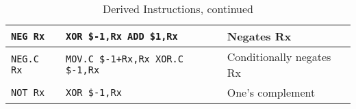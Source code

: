\documentclass{gqtekspec}
\begin{document}
\begin{table}
\begin{center}
\begin{tabular}{p{1.1in}p{1.8in}p{3in}}
{\tt NEG Rx} & \parbox[t]{1.5in}{\tt XOR \$-1,Rx \\ ADD \$1,Rx} & Negates Rx\\\hline
{\tt NEG.C Rx} & \parbox[t]{1.5in}{\tt MOV.C \$-1+Rx,Rx\\XOR.C \$-1,Rx}
	& Conditionally negates Rx\\\hline
{\tt NOT Rx } & {\tt XOR \$-1,Rx } & One's complement\\\hline
\end{tabular}
\caption{Derived Instructions, continued}\label{tbl:derived-2}
\end{center}\end{table}
\end{document}
